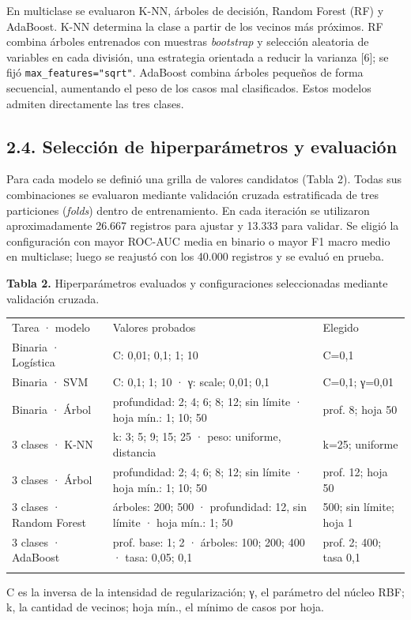 \documentclass[10pt,a4paper]{article}
\newenvironment{tabla}{\par\begingroup\small
  \setlength{\LTpre}{2pt}\setlength{\LTpost}{2pt}\setlength{\tabcolsep}{4.5pt}
  \renewcommand{\arraystretch}{1.08}}{\endgroup\par}
\newcommand{\epigrafetabla}[1]{\noindent\begin{minipage}{\linewidth}\small\justifying\noindent #1\end{minipage}\par\vspace{2pt}}
\newcommand{\notatabla}[1]{\vspace{3pt}\noindent\begin{minipage}{\linewidth}\footnotesize\justifying\noindent #1\end{minipage}\par}
\renewcommand{\toprule}{\specialrule{1pt}{2pt}{2pt}}
\renewcommand{\bottomrule}{\specialrule{1pt}{2pt}{0pt}}
\renewcommand{\midrule}{\specialrule{.5pt}{2pt}{2pt}}
\begin{document}
En multiclase se evaluaron K-NN, árboles de decisión, Random Forest (RF) y AdaBoost. K-NN determina la clase a partir de los vecinos más próximos. RF
combina árboles entrenados con muestras \emph{bootstrap} y selección aleatoria de variables en cada división, una estrategia orientada a reducir la
varianza {[}6{]}; se fijó \texttt{max\_features="sqrt"}. AdaBoost combina árboles pequeños de forma secuencial, aumentando el peso de los casos mal
clasificados. Estos modelos admiten directamente las tres clases.

\hypertarget{selecciuxf3n-de-hiperparuxe1metros-y-evaluaciuxf3n}{%
\subsection{2.4. Selección de hiperparámetros y evaluación}\label{selecciuxf3n-de-hiperparuxe1metros-y-evaluaciuxf3n}}

Para cada modelo se definió una grilla de valores candidatos (Tabla 2). Todas sus combinaciones se evaluaron mediante validación cruzada estratificada
de tres particiones (\emph{folds}) dentro de entrenamiento. En cada iteración se utilizaron aproximadamente 26.667 registros para ajustar y 13.333
para validar. Se eligió la configuración con mayor ROC-AUC media en binario o mayor F1 macro medio en multiclase; luego se reajustó con los 40.000
registros y se evaluó en prueba.

\begin{table}[!htbp]
\begin{tabla}
\epigrafetabla{\textbf{Tabla 2.} Hiperparámetros evaluados y configuraciones
seleccionadas mediante validación cruzada.}
\begin{tabular*}{\linewidth}{@{\extracolsep{\fill}}lll@{}}
\toprule\noalign{}
Tarea · modelo & Valores probados & Elegido \\
\midrule\noalign{}
Binaria · Logística & C: 0,01; 0,1; 1; 10 & C=0,1 \\
Binaria · SVM & C: 0,1; 1; 10 · γ: scale; 0,01; 0,1 & C=0,1; γ=0,01 \\
Binaria · Árbol & profundidad: 2; 4; 6; 8; 12; sin límite · hoja mín.:
1; 10; 50 & prof. 8; hoja 50 \\
3 clases · K-NN & k: 3; 5; 9; 15; 25 · peso: uniforme, distancia & k=25;
uniforme \\
3 clases · Árbol & profundidad: 2; 4; 6; 8; 12; sin límite · hoja mín.:
1; 10; 50 & prof. 12; hoja 50 \\
3 clases · Random Forest & árboles: 200; 500 · profundidad: 12, sin
límite · hoja mín.: 1; 50 & 500; sin límite; hoja 1 \\
3 clases · AdaBoost & prof. base: 1; 2 · árboles: 100; 200; 400 · tasa:
0,05; 0,1 & prof. 2; 400; tasa 0,1 \\
\bottomrule
\end{tabular*}
\notatabla{C es la inversa de la intensidad de regularización; γ, el parámetro del
núcleo RBF; k, la cantidad de vecinos; hoja mín., el mínimo de casos por
hoja.}
\end{tabla}
\end{table}
\end{document}
